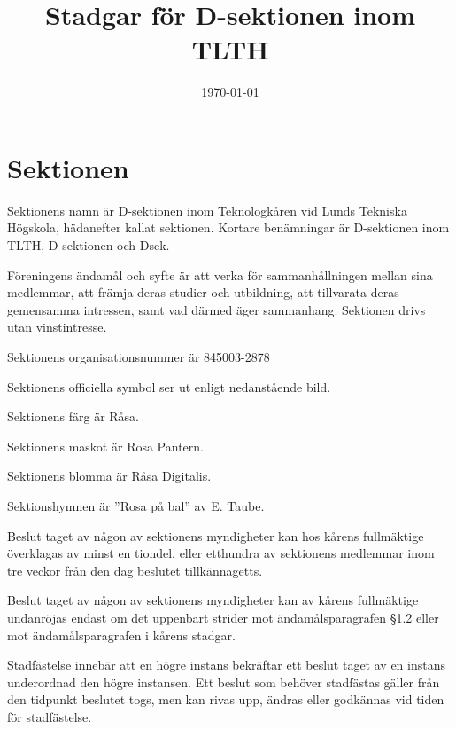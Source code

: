 \documentclass[stadgar]{dsekprotokoll}
\begin{document}
\title{Stadgar för D-sektionen inom TLTH}
\date{\today}

\maketitle

\section{Sektionen}

\begin{stadgeavsnitt}


Sektionens namn är D-sektionen inom Teknologkåren vid Lunds Tekniska Högskola, hädanefter kallat sektionen. Kortare benämningar är D-sektionen inom TLTH, D-sektionen och Dsek.


Föreningens ändamål och syfte är att verka för sammanhållningen mellan sina
medlemmar, att främja deras studier och utbildning, att tillvarata deras
gemensamma intressen, samt vad därmed äger sammanhang. Sektionen drivs utan
vinstintresse.

Sektionens organisationsnummer är 845003-2878\\


Sektionens officiella symbol ser ut enligt nedanstående bild.

\tthdump{\Dsymbol[10mm]}


Sektionens färg är Råsa.


Sektionens maskot är Rosa Pantern.


Sektionens blomma är Råsa Digitalis.


Sektionshymnen är ''Rosa på bal'' av E. Taube.


Beslut taget av någon av sektionens myndigheter kan hos kårens fullmäktige
överklagas av minst en tiondel, eller etthundra av sektionens medlemmar
inom tre veckor från den dag beslutet tillkännagetts.


Beslut taget av någon av sektionens myndigheter kan av kårens fullmäktige
undanröjas endast om det uppenbart strider mot ändamålsparagrafen \S1.2
eller mot ändamålsparagrafen i kårens stadgar.


Stadfästelse innebär att en högre instans bekräftar ett beslut taget av en instans underordnad den högre instansen. Ett beslut som behöver stadfästas gäller från den tidpunkt beslutet togs, men kan rivas upp, ändras eller godkännas vid tiden för stadfästelse.

\end{stadgeavsnitt}
\end{document}

